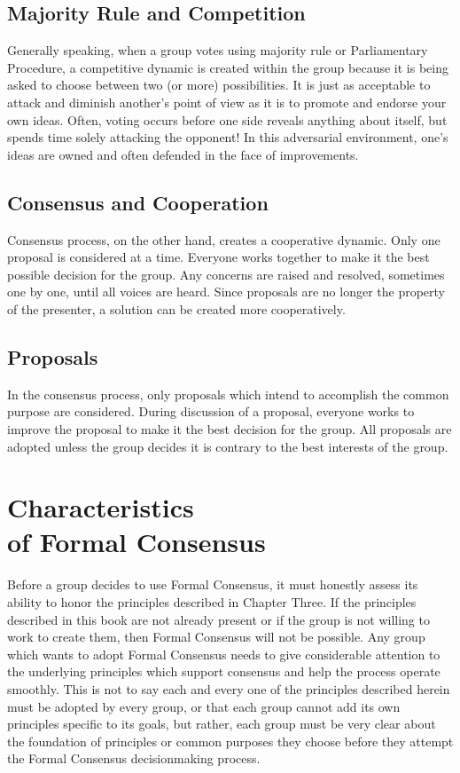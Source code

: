 \subsection*{Majority Rule and Competition}

Generally speaking, when a group votes using majority rule or
Parliamentary Procedure, a competitive dynamic is created within
the group because it is being asked to choose between two (or more)
possibilities. It is just as acceptable to attack and diminish
another's point of view as it is to promote and endorse your own
ideas. Often, voting occurs before one side reveals anything about
itself, but spends time solely attacking the opponent! In this
adversarial environment, one's ideas are owned and often defended
in the face of improvements.

\subsection*{Consensus and Cooperation}

Consensus process, on the other hand, creates a cooperative
dynamic. Only one proposal is considered at a time. Everyone works
together to make it the best possible decision for the group. Any
concerns are raised and resolved, sometimes one by one, until all
voices are heard. Since proposals are no longer the property of the
presenter, a solution can be created more cooperatively.

\subsection*{Proposals}

In the consensus process, only proposals which intend to
accomplish the common purpose are considered. During discussion of
a proposal, everyone works to improve the proposal to make it the
best decision for the group. All proposals are adopted unless the
group decides it is contrary to the best interests of the group.

\section[Characteristics]{Characteristics\\ of Formal Consensus}

Before a group decides to use Formal Consensus, it must honestly
assess its ability to honor the principles described in Chapter
Three. If the principles described in this book are not already
present or if the group is not willing to work to create them, then
Formal Consensus will not be possible. Any group which wants to
adopt Formal Consensus needs to give considerable attention to the
underlying principles which support consensus and help the process
operate smoothly. This is not to say each and every one of the
principles described herein must be adopted by every group, or
that each group cannot add its own principles specific to its
goals, but rather, each group must be very clear about the
foundation of principles or common purposes they choose before they
attempt the Formal Consensus decisionmaking process.

